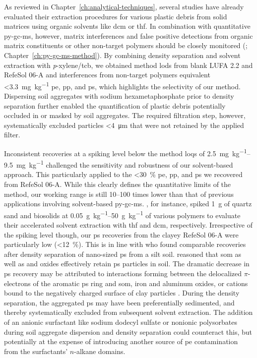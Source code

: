 As reviewed in Chapter~\ref{ch:analytical-techniques}, several studies have already evaluated their extraction procedures for various plastic debris from solid matrices using organic solvents like \ac{dcm} or \ac{thf}. In combination with quantitative \ac{py-gc-ms}, however, matrix interferences and false positive detections from organic matrix constituents or other non-target polymers should be closely monitored (\citealp{DierkesQuantification2019}; Chapter~\ref{ch:py-gc-ms-method}).
By combining density separation and solvent extraction with \textit{p}-xylene/\ac{tcb}, we obtained method \acp{lod} from blank LUFA 2.2 and RefeSol 06-A and interferences from non-target polymers equivalent \SI{<3.3}{\milli\gram\per\kilo\gram} \ac{pe}, \ac{pp}, and \ac{ps}, which highlights the selectivity of our method. Dispersing soil aggregates with sodium hexametaphosphate prior to density separation further enabled the quantification of plastic debris potentially occluded in or masked by soil aggregates. The required filtration step, however, systematically excluded particles \SI{<4}{\micro\meter} that were not retained by the applied filter.

Inconsistent recoveries at a spiking level below the method \acp{loq} of \SIrange[range-phrase={ to }]{2.5}{9.5}{\milli\gram\per\kilo\gram} challenged the sensitivity and robustness of our solvent-based approach. This particularly applied to the \SI{<30}{\percent} \ac{pe}, \ac{pp}, and \ac{ps} we recovered from RefeSol 06-A. While this clearly defines the quantitative limits of the method, our working range is still \numrange{10}{100} times lower than that of previous applications involving solvent-based \ac{py-gc-ms}. , for instance, spiked \SI{1}{\gram} of quartz sand and biosolids at \SIrange{0.05}{50}{\gram\per\kilo\gram} of various polymers to evaluate their accelerated solvent extraction with \ac{thf} and \ac{dcm}, respectively.
Irrespective of the spiking level though, our \ac{ps} recoveries from the clayey RefeSol 06-A were particularly low (\SI{<12}{\percent}). This is in line with \citet{WangPoor2018} who found comparable recoveries after density separation of nano-sized \ac{ps} from a silt soil. \citet{LuoDistribution2020,WuTransport2020} reasoned that \ac{som} as well as  and  oxides effectively retain \ac{ps} particles in soil. The dramatic decrease in \ac{ps} recovery may be attributed to interactions forming between the delocalized $\pi$-electrons of the aromatic \ac{ps} ring and \ac{som}, iron and aluminum oxides, or cations bound to the negatively charged surface of clay particles \citep{NewcombDeveloping2017}. During the density separation, the aggregated \ac{ps} may have been preferentially sedimented, and thereby systematically excluded from subsequent solvent extraction. The addition of an anionic surfactant like sodium dodecyl sulfate or nonionic polysorbates during soil aggregate dispersion and density separation could counteract this, but potentially at the expense of introducing another source of \ac{pe} contamination from the surfactants' $n$-alkane domains.

